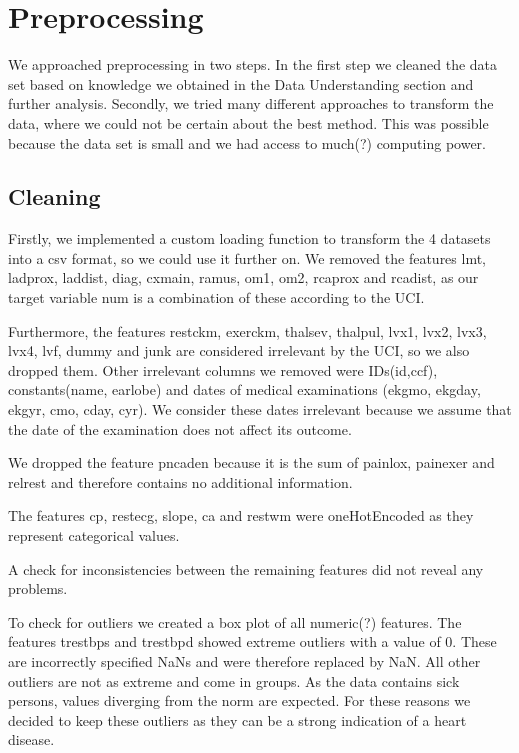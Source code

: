 \chapter{Preprocessing}
We approached preprocessing in two steps. In the first step we cleaned the data set based on knowledge we obtained in the Data Understanding section and further analysis. 
Secondly, we tried many different approaches to transform the data, where we could not be certain about the best method. This was possible because the data set is small and we had access to much(?) computing power.

\section{Cleaning}
Firstly, we implemented a custom loading function to transform the 4 datasets into a csv format, so we could use it further on.
We removed the features lmt, ladprox, laddist, diag, cxmain, ramus, om1, om2, rcaprox and rcadist, as our target variable num is a combination of these according to the UCI. 


Furthermore, the features restckm, exerckm, thalsev, thalpul, lvx1, lvx2, lvx3, lvx4, lvf, dummy and junk are considered irrelevant by the UCI, so we also dropped them. Other irrelevant columns we removed were IDs(id,ccf), constants(name, earlobe) and dates of medical examinations (ekgmo, ekgday, ekgyr, cmo, cday, cyr). We consider these dates irrelevant because we assume that the date of  the examination does not affect its outcome. 

We dropped the feature pncaden because it is the sum of painlox, painexer and relrest and therefore contains no additional information. 

The features cp, restecg, slope, ca and restwm were oneHotEncoded as they represent categorical values.

A check for inconsistencies between the remaining features did not reveal any problems. 

To check for outliers we created a box plot of all numeric(?) features. The features trestbps and trestbpd showed extreme outliers with a value of 0. These are incorrectly specified NaNs and were therefore replaced by NaN. All other outliers are not as extreme and come in groups. As the data contains sick persons, values diverging from the norm are expected. For these reasons we decided to keep these outliers as they can be a strong indication of a heart disease.

